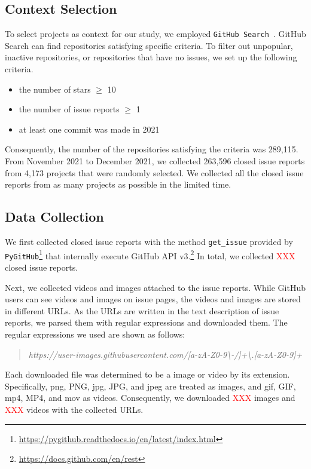 \subsection{Context Selection}
\label{sec:design:context}
To select projects as context for our study, we employed \texttt{GitHub Search}~\citep{msr2021data}. GitHub Search can find repositories satisfying specific criteria. To filter out unpopular, inactive repositories, or repositories that have no issues, we set up the following criteria.
\begin{itemize}
	\item the number of stars $\geq$ 10
	\item the number of issue reports $\geq$ 1
	\item at least one commit was made in 2021
\end{itemize}
Consequently, the number of the repositories satisfying the criteria was 289,115. From November 2021 to December 2021, we collected 263,596 closed issue reports from 4,173 projects that were randomly selected. 
We collected all the closed issue reports from as many projects as possible in the limited time.  



% 

\subsection{Data Collection}
We first collected closed issue reports with the method \texttt{get\_issue} provided by  \texttt{PyGitHub}\footnote{\url{https://pygithub.readthedocs.io/en/latest/index.html}} that internally execute GitHub API v3.\footnote{\url{https://docs.github.com/en/rest}} In total, we collected \textcolor{red}{XXX} closed issue reports. 

Next, we collected videos and images attached to the issue reports. While GitHub users can see videos and images on issue pages, the videos and images are stored in different URLs. As the URLs are written in the text description of issue reports, we parsed them with regular expressions and downloaded them. The regular expressions we used are shown as follows:
\begin{quote}
\addtolength\leftmargini{0in}
{\it https://user-images.githubusercontent.com/[a-zA-Z0-9\textbackslash-/]+\textbackslash.[a-zA-Z0-9]+}
\end{quote}
Each downloaded file was determined to be a image or video by its extension. Specifically, png, PNG, jpg, JPG, and jpeg are treated as images, and  gif, GIF, mp4, MP4, and mov as videos.
Consequently, we downloaded \textcolor{red}{XXX} images and \textcolor{red}{XXX} videos with the collected URLs. 

